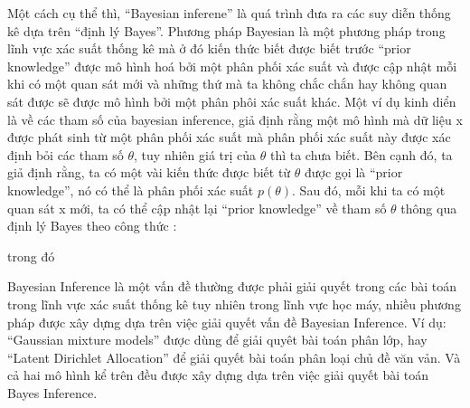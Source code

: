         Một cách cụ thể thì, ``Bayesian inferene'' là quá trình đưa ra các suy diễn thống kê dựa trên ``định lý Bayes''. Phương pháp Bayesian là một phương pháp trong lĩnh vực xác suất thống kê mà ở đó kiến thức biết được biết trước ``prior knowledge'' được mô hình hoá bởi một phân phối xác suất và được cập nhật mỗi khi có một quan sát mới và những thứ mà ta không chắc chắn hay không quan sát được sẽ được mô hình bởi một phân phôi xác suất khác. Một ví dụ kinh diển là về các tham số của bayesian inference, giả định rằng một mô hình mà dữ liệu x được phát sinh từ một phân phối xác suất mà phân phối xác suất này được xác định bỏi các tham số $\theta$, tuy nhiên giá trị của $\theta$ thì ta chưa biết. Bên cạnh đó, ta giả định rằng, ta có một vài kiến thức được biết từ $\theta$ được gọi là ``prior knowledge'', nó có thể là phân phối xác suất $p(\theta)$. Sau đó, mỗi khi ta có một quan sát x mới, ta có thể cập nhật lại ``prior knowledge'' về tham số $\theta$ thông qua định lý Bayes theo công thức :

        trong đó 

        
        Bayesian Inference là một vấn đề thường được phải giải quyết trong các bài toán trong lĩnh vực xác suất thống kê tuy nhiên trong lĩnh vực học máy, nhiều phương pháp được xây dựng dựa trên việc giải quyết vấn đề Bayesian Inference. Ví dụ: ``Gaussian mixture models'' được dùng để giải quyêt bài toán phân lớp, hay ``Latent Dirichlet Allocation'' để giải quyết bài toán phân loại chủ đề văn vản. Và cả hai mô hình kể trên đều được xây dựng dựa trên việc giải quyết bài toán Bayes Inference.  



